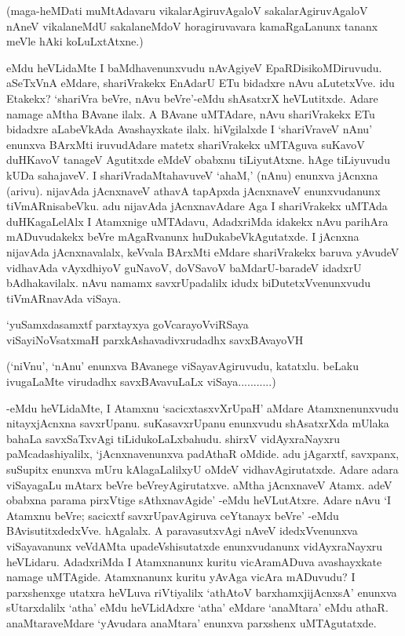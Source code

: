 (maga-heMDati muMtAdavaru vikalarAgiruvAgaloV sakalarAgiruvAgaloV nAneV vikalaneMdU sakalaneMdoV horagiruvavara kamaRgaLanunx tananx meVle hAki koLuLxtAtxne.)

eMdu heVLidaMte I baMdhavenunxvudu nAvAgiyeV EpaRDisikoMDiruvudu. aSeTxVnA eMdare, shariVrakekx EnAdarU ETu bidadxre nAvu aLutetxVve. idu Etakekx? `shariVra beVre, nAvu beVre'-eMdu shAsatxrX heVLutitxde. Adare namage aMtha BAvane ilalx. A BAvane uMTAdare, nAvu shariVrakekx ETu bidadxre aLabeVkAda Avashayxkate ilalx. hiVgilalxde I `shariVraveV nAnu' enunxva BArxMti iruvudAdare matetx shariVrakekx uMTAguva suKavoV duHKavoV tanageV Agutitxde eMdeV obabxnu tiLiyutAtxne. hAge tiLiyuvudu kUDa sahajaveV. I shariVradaMtahavuveV `ahaM,' (nAnu) enunxva jAcnxna (arivu). nijavAda jAcnxnaveV athavA tapApxda jAcnxnaveV enunxvudanunx tiVmARnisabeVku. adu nijavAda jAcnxnavAdare Aga I shariVrakekx uMTAda duHKagaLelAlx I Atamxnige uMTAdavu, AdadxriMda idakekx nAvu parihAra mADuvudakekx beVre mAgaRvanunx huDukabeVkAgutatxde. I jAcnxna nijavAda jAcnxnavalalx, keVvala BArxMti eMdare shariVrakekx baruva yAvudeV vidhavAda vAyxdhiyoV guNavoV, doVSavoV baMdarU-baradeV idadxrU bAdhakavilalx. nAvu namamx savxrUpadalilx idudx biDutetxVvenunxvudu tiVmARnavAda viSaya.

\begin{shloka}
`yuSamxdasamxtf parxtayxya goVcarayoVviRSaya\\
viSayiNoVsatxmaH parxkAshavadivxrudadhx savxBAvayoVH
\end{shloka}

(`niVnu', `nAnu' enunxva BAvanege viSayavAgiruvudu, katatxlu. beLaku ivugaLaMte virudadhx savxBAvavuLaLx viSaya...........)

-eMdu heVLidaMte, I Atamxnu `sacicxtasxvXrUpaH' aMdare Atamxnenunxvudu nitayxjAcnxna savxrUpanu. suKasavxrUpanu enunxvudu shAsatxrXda mUlaka bahaLa savxSaTxvAgi tiLidukoLaLxbahudu. shirxV vidAyxraNayxru paMcadashiyalilx, `jAcnxnavenunxva padAthaR oMdide. adu jAgarxtf, savxpanx, suSupitx enunxva mUru kAlagaLalilxyU oMdeV vidhavAgirutatxde. Adare adara viSayagaLu mAtarx beVre beVreyAgirutatxve. aMtha jAcnxnaveV Atamx. adeV obabxna parama pirxVtige sAthxnavAgide' -eMdu heVLutAtxre. Adare nAvu `I Atamxnu beVre; sacicxtf savxrUpavAgiruva ceYtanayx beVre' -eMdu BAvisutitxdedxVve. hAgalalx. A paravasutxvAgi nAveV idedxVvenunxva viSayavanunx veVdAMta upadeVshisutatxde enunxvudanunx vidAyxraNayxru heVLidaru. AdadxriMda I Atamxnanunx kuritu vicAramADuva avashayxkate namage uMTAgide. Atamxnanunx kuritu yAvAga vicAra mADuvudu? I parxshenxge utatxra heVLuva riVtiyalilx `athAtoV barxhamxjijAcnxsA' enunxva sUtarxdalilx `atha' eMdu heVLidAdxre `atha' eMdare `anaMtara' eMdu athaR. anaMtaraveMdare `yAvudara anaMtara' enunxva parxshenx uMTAgutatxde.

